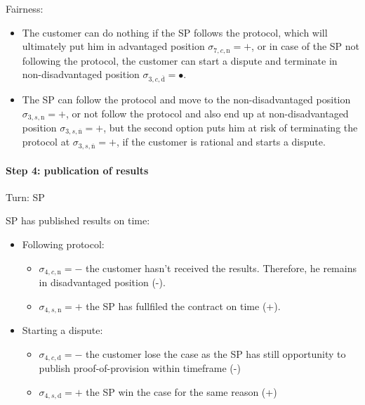 \documentclass{ieeeaccess}
\begin{document}
Fairness:

\begin{itemize}

\item
  The customer can do nothing if the SP follows the protocol, which will
  ultimately put him in advantaged position
  \(\sigma_{7, c, \mathrm{n}} = +\), or in case of the SP not following
  the protocol, the customer can start a dispute and terminate in
  non-disadvantaged position
  \(\sigma_{3, c, \overline{\mathrm{d}}} = •\).
\item
  The SP can follow the protocol and move to the non-disadvantaged
  position \(\sigma_{3, s, \mathrm{n}} = +\), or not follow the protocol
  and also end up at non-disadvantaged position
  \(\sigma_{3, s, \overline{\mathrm{n}}} = +\), but the second option
  puts him at risk of terminating the protocol at
  \(\sigma_{3, s, \overline{\mathrm{n}}} = +\), if the customer is
  rational and starts a dispute.
\end{itemize}

\paragraph{Step 4: publication of
results}\label{step-4-publication-of-results}

Turn: SP

SP has published results on time:

\begin{itemize}
\item
  Following protocol:

  \begin{itemize}
  
  \item
    \(\sigma_{4, c, \mathrm{n}} = -\) the customer hasn't received the
    results. Therefore, he remains in disadvantaged position (-).
  \item
    \(\sigma_{4, s, \mathrm{n}} = +\) the SP has fullfiled the contract
    on time (+).
  \end{itemize}
\item
  Starting a dispute:

  \begin{itemize}
  
  \item
    \(\sigma_{4, c, \mathrm{d}} = -\) the customer lose the case as the
    SP has still opportunity to publish proof-of-provision within
    timeframe (-)
  \item
    \(\sigma_{4, s, \mathrm{d}} = +\) the SP win the case for the same
    reason (+)
  \end{itemize}
\end{itemize}
\end{document}

